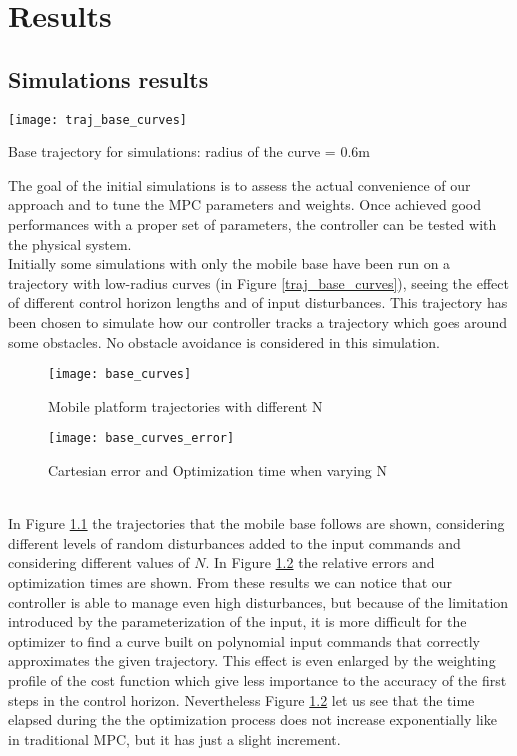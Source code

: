 
\chapter{Results}
\label{chapter7}
\section{Simulations results}
\begin{floatingfigure}[r]{.33\textwidth}
	\centering
	\texttt{[image: traj\_base\_curves]}
	\caption{Base trajectory for simulations: radius of the curve = 0.6m\label{traj_base_curves}}
\end{floatingfigure}
The goal of the initial simulations is to assess the actual convenience of our approach and to tune the MPC parameters and weights. Once achieved good performances with a proper set of parameters, the controller can be tested with the physical system.\\
Initially some simulations with only the mobile base have been run on a trajectory with low-radius curves (in Figure \ref{traj_base_curves}), seeing the effect of different control horizon lengths and of input disturbances. This trajectory has been chosen to simulate how our controller tracks a trajectory which goes around some obstacles. No obstacle avoidance is considered in this simulation.
\begin{figure}[!h]
	\centering
	\texttt{[image: base\_curves]}
	\caption{Mobile platform trajectories with different N}
	\label{base_curves}
\end{figure}
\begin{figure}[!h]
	\texttt{[image: base\_curves\_error]}
	\centering
	\caption{Cartesian error and Optimization time when varying N}
	\label{base_curves_errors}
\end{figure}
\\In Figure \ref{base_curves} the trajectories that the mobile base follows are shown, considering different levels of random disturbances added to the input commands and considering different values of $N$. In Figure \ref{base_curves_errors} the relative errors and optimization times are shown. From these results we can notice that our controller is able to manage even high disturbances, but because of the limitation introduced by the parameterization of the input, it is more difficult for the optimizer to find a curve built on polynomial input commands that correctly approximates the given trajectory. This effect is even enlarged by the weighting profile of the cost function which give less importance to the accuracy of the first steps in the control horizon. Nevertheless Figure \ref{base_curves_errors} let us see that the time elapsed during the the optimization process does not increase exponentially like in traditional MPC, but it has just a slight increment.\\
